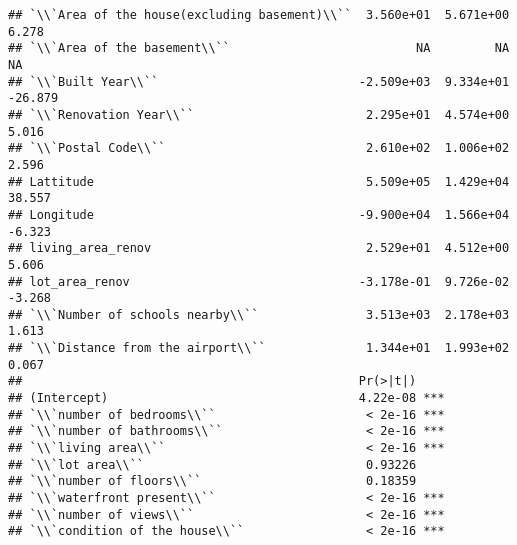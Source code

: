 \documentclass[
]{article}
\begin{document}
\begin{verbatim}
## `\\`Area of the house(excluding basement)\\``  3.560e+01  5.671e+00   6.278
## `\\`Area of the basement\\``                          NA         NA      NA
## `\\`Built Year\\``                            -2.509e+03  9.334e+01 -26.879
## `\\`Renovation Year\\``                        2.295e+01  4.574e+00   5.016
## `\\`Postal Code\\``                            2.610e+02  1.006e+02   2.596
## Lattitude                                      5.509e+05  1.429e+04  38.557
## Longitude                                     -9.900e+04  1.566e+04  -6.323
## living_area_renov                              2.529e+01  4.512e+00   5.606
## lot_area_renov                                -3.178e-01  9.726e-02  -3.268
## `\\`Number of schools nearby\\``               3.513e+03  2.178e+03   1.613
## `\\`Distance from the airport\\``              1.344e+01  1.993e+02   0.067
##                                               Pr(>|t|)    
## (Intercept)                                   4.22e-08 ***
## `\\`number of bedrooms\\``                     < 2e-16 ***
## `\\`number of bathrooms\\``                    < 2e-16 ***
## `\\`living area\\``                            < 2e-16 ***
## `\\`lot area\\``                               0.93226    
## `\\`number of floors\\``                       0.18359    
## `\\`waterfront present\\``                     < 2e-16 ***
## `\\`number of views\\``                        < 2e-16 ***
## `\\`condition of the house\\``                 < 2e-16 ***

\end{verbatim}
\end{document}
